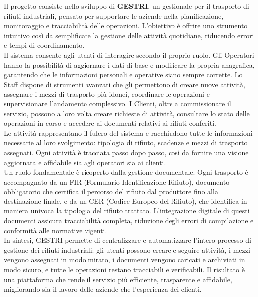 \documentclass[a4paper]{report}
\begin{document}
\tableofcontents
\thispagestyle{empty}

\setcounter{page}{0}

Il progetto consiste nello sviluppo di \textbf{GESTRI}, un gestionale per il trasporto di rifiuti industriali, pensato per supportare le aziende nella pianificazione, monitoraggio e tracciabilità delle operazioni.
L’obiettivo è offrire uno strumento intuitivo così da semplificare la gestione delle attività quotidiane, riducendo errori e tempi di coordinamento.
\\
Il sistema consente agli utenti di interagire secondo il proprio ruolo.
Gli Operatori hanno la possibilità di aggiornare i dati di base e modificare la propria anagrafica, garantendo che le informazioni personali e operative siano sempre corrette. 
Lo Staff dispone di strumenti avanzati che gli permettono di creare nuove attività, assegnare i mezzi di trasporto più idonei, coordinare le operazioni e supervisionare l’andamento complessivo. 
I Clienti, oltre a commissionare il servizio, possono a loro volta creare richieste di attività, consultare lo stato delle operazioni in corso e accedere ai documenti relativi ai rifiuti conferiti.
\\
Le attività rappresentano il fulcro del sistema e racchiudono tutte le informazioni necessarie al loro svolgimento: tipologia di rifiuto, scadenze e mezzi di trasporto assegnati.
Ogni attività è tracciata passo dopo passo, così da fornire una visione aggiornata e affidabile sia agli operatori sia ai clienti.
\\
Un ruolo fondamentale è ricoperto dalla gestione documentale. 
Ogni trasporto è accompagnato da un FIR (Formulario Identificazione Rifiuto), documento obbligatorio che certifica il percorso del rifiuto dal produttore fino alla destinazione finale, e da un CER (Codice Europeo del Rifiuto), che identifica in maniera univoca la tipologia del rifiuto trattato.
L’integrazione digitale di questi documenti assicura tracciabilità completa, riduzione degli errori di compilazione e conformità alle normative vigenti.
\\
In sintesi, GESTRI permette di centralizzare e automatizzare l’intero processo di gestione dei rifiuti industriali: gli utenti possono creare e seguire attività, i mezzi vengono assegnati in modo mirato, i documenti vengono caricati e archiviati in modo sicuro, e tutte le operazioni restano tracciabili e verificabili.
Il risultato è una piattaforma che rende il servizio più efficiente, trasparente e affidabile, migliorando sia il lavoro delle aziende che l’esperienza dei clienti.
\end{document}
